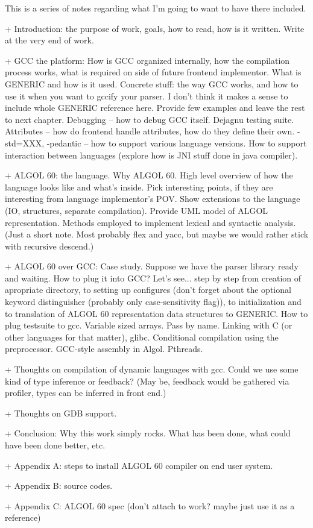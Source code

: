 \documentclass[a4paper,11pt]{report}
\begin{document}
This is a series of notes regarding what I'm going to want to have
there included.

 + Introduction: the purpose of work, goals, how to read, how is it
 written.  Write at the very end of work.

 + GCC the platform: How is GCC organized internally, how the
 compilation process works, what is required on side of future
 frontend implementor.  What is GENERIC and how is it used.  Concrete
 stuff: the way GCC works, and how to use it when you want to gccify
 your parser.  I don't think it makes a sense to include whole GENERIC
 reference here.  Provide few examples and leave the rest to next
 chapter.  Debugging -- how to debug GCC itself.  Dejagnu testing
 suite.  Attributes -- how do frontend handle attributes, how do they
 define their own.  -std=XXX, -pedantic -- how to support various
 language versions.  How to support interaction between languages
 (explore how is JNI stuff done in java compiler).

 + ALGOL 60: the language.  Why ALGOL 60.  High level overview of how
 the language looks like and what's inside.  Pick interesting points,
 if they are interesting from language implementor's POV.  Show
 extensions to the language (IO, structures, separate compilation).
 Provide UML model of ALGOL representation.  Methods employed to
 implement lexical and syntactic analysis. (Just a short note.  Most
 probably flex and yacc, but maybe we would rather stick with
 recursive descend.)

 + ALGOL 60 over GCC: Case study.  Suppose we have the parser library
 ready and waiting.  How to plug it into GCC?  Let's see... step by
 step from creation of apropriate directory, to setting up configures
 (don't forget about the optional keyword distinguisher (probably only
 case-sensitivity flag)), to initialization and to translation of
 ALGOL 60 representation data structures to GENERIC.  How to plug
 testsuite to gcc.  Variable sized arrays.  Pass by name.  Linking
 with C (or other languages for that matter), glibc.  Conditional
 compilation using the preprocessor.  GCC-style assembly in Algol.
 Pthreads.

 + Thoughts on compilation of dynamic languages with gcc.  Could we
 use some kind of type inference or feedback? (May be, feedback would
 be gathered via profiler, types can be inferred in front end.)

 + Thoughts on GDB support.

 + Conclusion: Why this work simply rocks.  What has been done, what
 could have been done better, etc.

 + Appendix A: steps to install ALGOL 60 compiler on end user system.

 + Appendix B: source codes.

 + Appendix C: ALGOL 60 spec (don't attach to work? maybe just use it
 as a reference)
\end{document}

